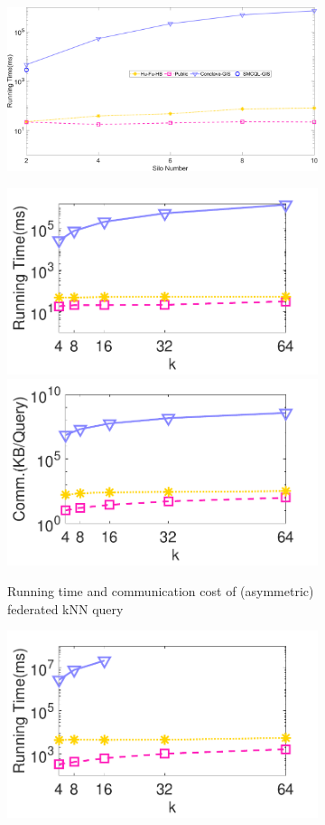 \begin{figure}[t]
    \begin{subfigure}{0.45\textwidth}
        \centering
        \includegraphics[width=\textwidth]{apdx/legend.pdf}
    \end{subfigure}
     \begin{subfigure}{0.48\textwidth}
        \centering
        \includegraphics[width=0.48\linewidth]{apdx/knn_k_time.pdf}
        \includegraphics[width=0.48\linewidth]{apdx/knn_k_cost.pdf}
        \caption{Running time and communication cost of (asymmetric) federated kNN query}
        \label{fig:knn-eff-k-n-hon}
    \end{subfigure}  
     \begin{subfigure}{0.48\textwidth}
        \centering
        \includegraphics[width=0.48\linewidth]{apdx/knnjoin_k_time.pdf}

\end{subfigure}
\end{figure}
